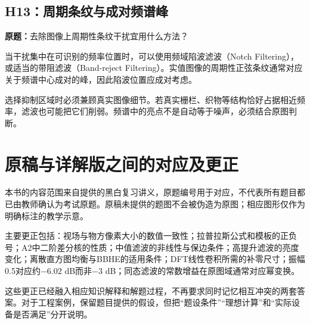 \subsection{H13：周期条纹与成对频谱峰}
\label{original:H13}
\textbf{原题：}去除图像上周期性条纹干扰宜用什么方法？

当干扰集中在可识别的频率位置时，可以使用频域陷波滤波（Notch Filtering），或适当的带阻滤波（Band-reject Filtering）。实值图像的周期性正弦条纹通常对应关于频谱中心成对的峰，因此陷波位置应成对考虑。

选择抑制区域时必须兼顾真实图像细节。若真实栅栏、织物等结构恰好占据相近频率，滤波也可能把它们削弱。频谱中的亮点不是自动等于噪声，必须结合原图判断。

\section{原稿与详解版之间的对应及更正}
本书的内容范围来自提供的黑白复习讲义，原题编号用于对应，不代表所有题目都已由教师确认为考试原题。原稿未提供的题图不会被伪造为原图；相应图形仅作为明确标注的教学示意。

主要更正包括：视场与物方像素大小的数值一致性；拉普拉斯公式和模板的正负号；A2中二阶差分核的性质；中值滤波的非线性与保边条件；高提升滤波的亮度变化；离散直方图均衡与BBHE的适用条件；DFT线性卷积所需的补零尺寸；振幅0.5对应约$-6.02$ dB而非$-3$ dB；同态滤波的常数增益在原图域通常对应幂变换。

这些更正已经融入相应知识解释和解题过程，不再要求同时记忆相互冲突的两套答案。对于工程案例，保留题目提供的假设，但把“题设条件”“理想计算”和“实际设备是否满足”分开说明。
